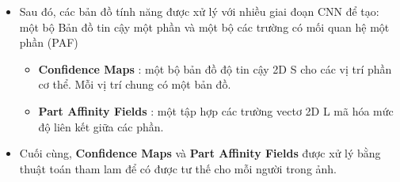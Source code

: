 \begin{itemize} %
\item Sau đó, các bản đồ tính năng được xử lý với nhiều giai đoạn CNN để tạo: một bộ Bản đồ tin cậy một phần và một bộ các trường có mối quan hệ một phần (PAF)
	\begin{itemize}
	\item \textbf{Confidence Maps} : một bộ bản đồ độ tin cậy 2D S cho các vị trí phần cơ thể. Mỗi vị trí chung có một bản đồ.
	\item \textbf{Part Affinity Fields} : một tập hợp các trường vectơ 2D L mã hóa mức độ liên kết giữa các phần.
	\end{itemize}
\end{itemize}


\begin{itemize} %
\item Cuối cùng, \textbf{Confidence Maps} và \textbf{Part Affinity Fields} được xử lý bằng thuật toán tham lam để có được tư thế cho mỗi người trong ảnh.
\end{itemize}

